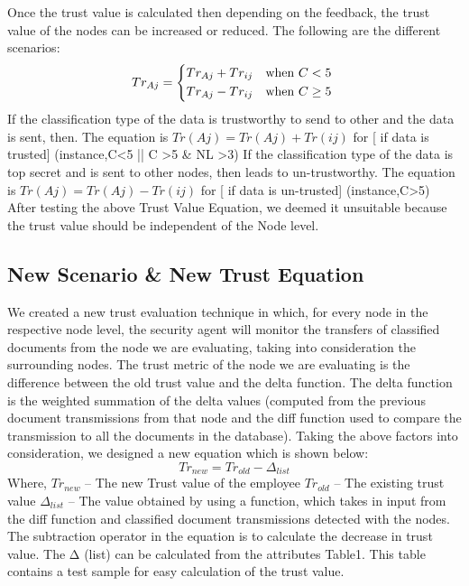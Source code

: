 Once the trust value is calculated then depending on the feedback, the trust
value of the nodes can be increased or reduced. The following are the different
scenarios: 
\begin{equation}
   Tr_{Aj} =    \begin{dcases*}
                    Tr_{Aj} + Tr_{ij} & when $C < 5$\\
                    Tr_{Aj} - Tr_{ij} & when $C \ge 5$
                \end{dcases*}
\end{equation}
If the classification type of the data is trustworthy to send to
other and
the data is sent, then. The equation is \(Tr (Aj)=Tr (Aj)+Tr (ij)\) for [ if
    data is trusted] (instance,C<5 || C >5 \& NL >3) If the classification type
    of the data is top secret and is sent to other nodes, then leads to
    un-trustworthy. The equation is \(Tr (Aj)=Tr (Aj)-Tr (ij)\)  for [ if data is
    un-trusted] (instance,C>5)
After testing the above Trust Value Equation, we deemed it unsuitable because the trust value should be independent of the Node level. 


\subsection{New Scenario \& New Trust Equation}
We created a new trust evaluation technique in which, for every node in the respective node level, the security agent will monitor the transfers of classified documents from the node we are evaluating, taking into consideration the surrounding nodes. The trust metric of the node we are evaluating is the difference between the old trust value and the delta function. The delta function is the weighted summation of the delta values (computed from the previous document transmissions from that node and the diff function used to compare the transmission to all the documents in the database). 
Taking the above factors into consideration, we designed a new equation which is shown below:
\begin{equation}
    Tr_{new}=Tr_{old} - \Delta_{list}
\end{equation}
Where, \(Tr_{new}\) – The new Trust value of the employee
\(Tr_{old}\) – The existing trust value
\(\Delta_{list}\) – The value obtained by using a function, which takes in input from the diff function and classified document transmissions detected with the nodes.
The subtraction operator in the equation is to calculate the decrease in trust value.
The Δ (list) can be calculated from the attributes Table1. This table contains a test sample for easy calculation of the trust value.

